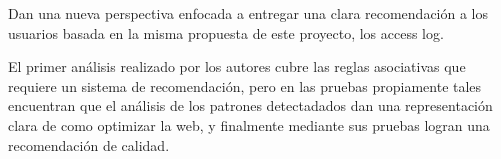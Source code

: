 Dan una nueva perspectiva enfocada a entregar una clara recomendación a los usuarios basada en la misma propuesta de este proyecto, los access log.

El primer análisis realizado por los autores cubre las reglas asociativas que requiere un sistema de recomendación, pero en las pruebas propiamente tales encuentran que el análisis de los patrones detectadados dan una representación clara de como optimizar la web, y finalmente mediante sus pruebas logran una recomendación de calidad.
